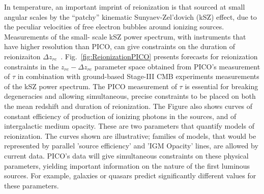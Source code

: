 \documentclass[PICOReport.tex]{subfiles}
\begin{document}
In temperature, an important imprint of reionization is that sourced at small angular scales by the ``patchy'' kinematic Sunyaev-Zel'dovich (kSZ) effect, due to the peculiar velocities of free electron bubbles around ionizing sources.  Measurements of the small- scale kSZ power spectrum, with instruments that have higher resolution than PICO, can give constraints on the duration of reionizaiton $\Delta z_{re}$~\citep{Calabrese2014}.
Fig.~\ref{fig:ReionizationPICO} presents forecasts for reionization constraints in the $z_{re} - \Delta z_{re}$ parameter space obtained from PICO's measurement of $\tau$ in combination with ground-based Stage-III CMB experiments measurements of the kSZ power spectrum. The PICO measurement of $\tau$ is essential for breaking degeneracies and allowing simultaneous, precise constraints to be placed on both the mean redshift and duration of reionization. The Figure also shows curves of constant efficiency of production of ionizing photons in the sources, and of intergalactic medium opacity. These are two parameters that quantify models of reionization. The curves shown are illustrative; families of models, that would be represented by parallel 'source efficiency' and 'IGM Opacity' lines, are allowed by current data. PICO's data will give simultaneous constraints on these physical parameters, yielding important information on the nature of the first luminous sources. For example, galaxies or quasars predict significantly different values for these parameters.  

\end{document}
